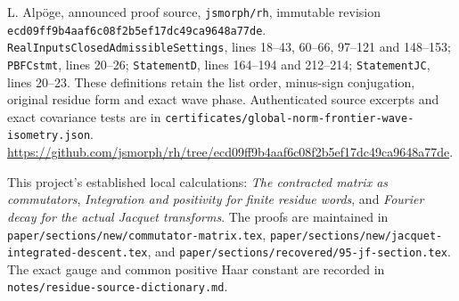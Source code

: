 L. Alp\"oge, announced proof source, \texttt{jsmorph/rh},
immutable revision
\texttt{ecd09ff9b4aaf6c08f2b5ef17dc49ca9648a77de}.
\texttt{RealInputsClosedAdmissibleSettings}, lines 18--43,
60--66, 97--121 and 148--153;
\texttt{PBFCstmt}, lines 20--26;
\texttt{StatementD}, lines 164--194 and 212--214;
\texttt{StatementJC}, lines 20--23.
These definitions retain the list order, minus-sign conjugation,
original residue form and exact wave phase.
Authenticated source excerpts and exact covariance tests are in
\texttt{certificates/global-norm-frontier-wave-isometry.json}.
\url{https://github.com/jsmorph/rh/tree/ecd09ff9b4aaf6c08f2b5ef17dc49ca9648a77de}.

This project's established local calculations:
\emph{The contracted matrix as commutators},
\emph{Integration and positivity for finite residue words},
and \emph{Fourier decay for the actual Jacquet transforms}.
The proofs are maintained in
\texttt{paper/sections/new/commutator-matrix.tex},
\texttt{paper/sections/new/jacquet-integrated-descent.tex},
and \texttt{paper/sections/recovered/95-jf-section.tex}.
The exact gauge and common positive Haar constant are recorded in
\texttt{notes/residue-source-dictionary.md}.

